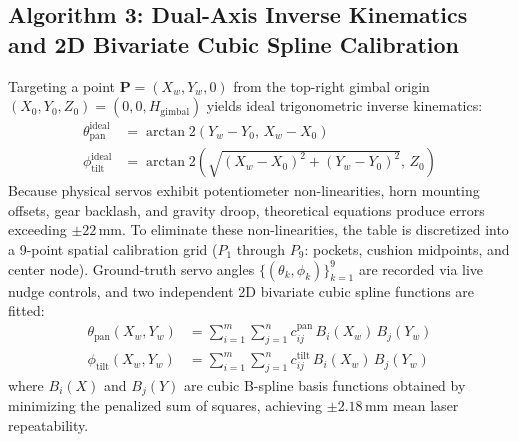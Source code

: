\subsection{Algorithm 3: Dual-Axis Inverse Kinematics and 2D Bivariate Cubic Spline Calibration}
Targeting a point $\mathbf{P} = (X_w, Y_w, 0)$ from the top-right gimbal origin $(X_0, Y_0, Z_0) = (0, 0, H_{\text{gimbal}})$ yields ideal trigonometric inverse kinematics:
\begin{align}
    \theta_{\text{pan}}^{\text{ideal}} &= \arctan2(Y_w - Y_0, \, X_w - X_0) \label{eq:pan_ideal} \\
    \phi_{\text{tilt}}^{\text{ideal}} &= \arctan2\left( \sqrt{(X_w - X_0)^2 + (Y_w - Y_0)^2}, \, Z_0 \right) \label{eq:tilt_ideal}
\end{align}
Because physical servos exhibit potentiometer non-linearities, horn mounting offsets, gear backlash, and gravity droop, theoretical equations produce errors exceeding $\pm 22\,\text{mm}$. To eliminate these non-linearities, the table is discretized into a 9-point spatial calibration grid ($P_1$ through $P_9$: pockets, cushion midpoints, and center node). Ground-truth servo angles $\{ (\theta_k, \phi_k) \}_{k=1}^9$ are recorded via live nudge controls, and two independent 2D bivariate cubic spline functions are fitted:
\begin{align}
    \theta_{\text{pan}}(X_w, Y_w) &= \sum_{i=1}^m \sum_{j=1}^n c_{ij}^{\text{pan}} \, B_i(X_w) \, B_j(Y_w) \label{eq:spline_pan} \\
    \phi_{\text{tilt}}(X_w, Y_w) &= \sum_{i=1}^m \sum_{j=1}^n c_{ij}^{\text{tilt}} \, B_i(X_w) \, B_j(Y_w) \label{eq:spline_tilt}
\end{align}
where $B_i(X)$ and $B_j(Y)$ are cubic B-spline basis functions obtained by minimizing the penalized sum of squares, achieving $\pm 2.18\,\text{mm}$ mean laser repeatability.

